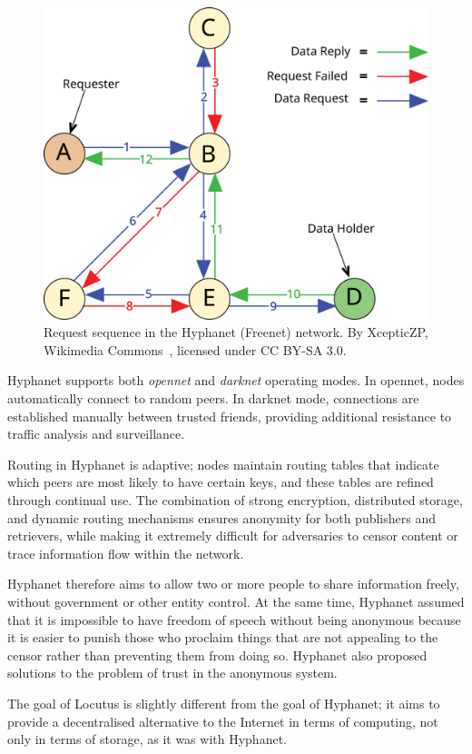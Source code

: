 \begin{figure}[ht]
  \centering
  \includegraphics[width=0.75\linewidth]{Images/freenet.png}
  \caption{Request sequence in the Hyphanet (Freenet) network. By XcepticZP, Wikimedia Commons~\cite{freenet_request_sequence_zp}, licensed under CC BY-SA 3.0.}
  \label{fig:freenet_sequence}
\end{figure}

Hyphanet supports both \emph{opennet} and \emph{darknet} operating modes. In opennet, nodes automatically connect to random peers. In darknet mode, connections are established manually between trusted friends, providing additional resistance to traffic analysis and surveillance.

Routing in Hyphanet is adaptive; nodes maintain routing tables that indicate which peers are most likely to have certain keys, and these tables are refined through continual use. The combination of strong encryption, distributed storage, and dynamic routing mechanisms ensures anonymity for both publishers and retrievers, while making it extremely difficult for adversaries to censor content or trace information flow within the network.

Hyphanet therefore aims to allow two or more people to share information freely, without government or other entity control.
At the same time, Hyphanet assumed that it is impossible to have freedom of speech without being anonymous because it is easier to punish those who proclaim things that are not appealing to the censor rather than preventing them from doing so. Hyphanet also proposed solutions to the problem of trust in the anonymous system.

The goal of Locutus \cite{locutus} is slightly different from the goal of Hyphanet; it aims to provide a decentralised alternative to the Internet in terms of computing, not only in terms of storage, as it was with Hyphanet.


